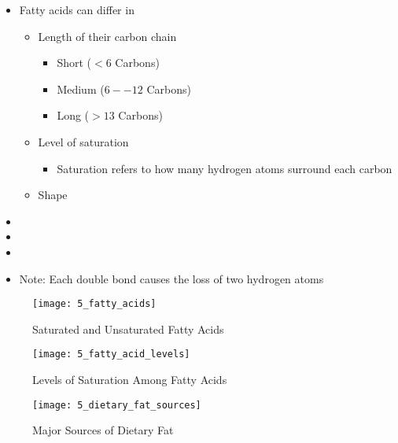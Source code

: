 \documentclass[title={Chapter 5}]{fdsn201notes}
\begin{document}
\begin{itemize}
	\item Fatty acids can differ in
	\begin{itemize}
		\item Length of their carbon chain
		\begin{itemize}
			\item Short ($<6$ Carbons)
			\item Medium ($6--12$ Carbons)
			\item Long ($>13$ Carbons)
		\end{itemize}
		\item Level of saturation
		\begin{itemize}
			\item Saturation refers to how many hydrogen atoms surround each carbon
		\end{itemize}
		\item Shape
	\end{itemize}
	\item {}
	\item {}
	\item {}
	\item Note: Each double bond causes the loss of two hydrogen atoms
\end{itemize}

\begin{figure}[H]
	\centering
	\texttt{[image: 5\_fatty\_acids]}
	\caption{Saturated and Unsaturated Fatty Acids}
	\label{fig:fatty-acids}
\end{figure}

\begin{figure}[H]
	\centering
	\texttt{[image: 5\_fatty\_acid\_levels]}
	\caption{Levels of Saturation Among Fatty Acids}
	\label{fig:fatty-acid-saturation}
\end{figure}

\begin{figure}[H]
	\centering
	\texttt{[image: 5\_dietary\_fat\_sources]}
	\caption{Major Sources of Dietary Fat}
	\label{fig:dietary_fat_sources}
\end{figure}
\end{document}
